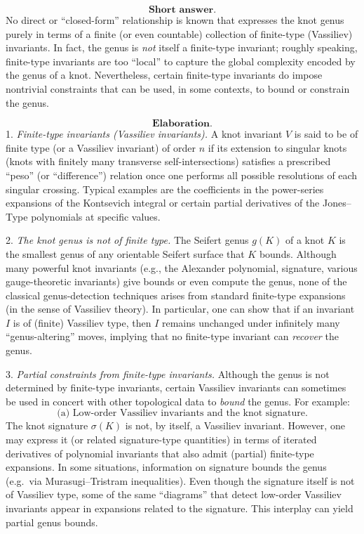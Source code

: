 \documentclass[12p]{article}
\newcounter{answercounter}
\newenvironment{answer}[1][]
{\refstepcounter{answercounter}%
\begin{tcolorbox}[
    title=Answer \theanswercounter: #1,
    colback=white, %
    colframe=gray,
    coltext=black, %
    fonttitle=\bfseries\normalsize,
    top=2mm,
    bottom=2mm,
    enlarge top initially by=5mm
]
\small
}
{\end{tcolorbox}}
\begin{document}
\begin{answer}[by openai/o1 (generated in 0 minutes and 50 seconds.)]
\[
\textbf{Short answer.}
\]
No direct or “closed-form” relationship is known that expresses the knot genus purely in terms of a finite (or even countable) collection of finite-type (Vassiliev) invariants.  In fact, the genus is \emph{not} itself a finite-type invariant; roughly speaking, finite-type invariants are too “local” to capture the global complexity encoded by the genus of a knot.  Nevertheless, certain finite-type invariants do impose nontrivial constraints that can be used, in some contexts, to bound or constrain the genus.

\[
\textbf{Elaboration.}
\]
1.  \emph{Finite-type invariants (Vassiliev invariants).}  
   A knot invariant \(V\) is said to be of finite type (or a Vassiliev invariant) of order \(n\) if its extension to singular knots (knots with finitely many transverse self-intersections) satisfies a prescribed “peso” (or “difference”) relation once one performs all possible resolutions of each singular crossing.  Typical examples are the coefficients in the power-series expansions of the Kontsevich integral or certain partial derivatives of the Jones–Type polynomials at specific values.

2.  \emph{The knot genus is not of finite type.}  
   The Seifert genus \(g(K)\) of a knot \(K\) is the smallest genus of any orientable Seifert surface that \(K\) bounds.  Although many powerful knot invariants (e.g., the Alexander polynomial, signature, various gauge-theoretic invariants) give bounds or even compute the genus, none of the classical genus-detection techniques arises from standard finite-type expansions (in the sense of Vassiliev theory).  In particular, one can show that if an invariant \(I\) is of (finite) Vassiliev type, then \(I\) remains unchanged under infinitely many “genus-altering” moves, implying that no finite-type invariant can \emph{recover} the genus.

3.  \emph{Partial constraints from finite-type invariants.}
   Although the genus is not determined by finite-type invariants, certain Vassiliev invariants can sometimes be used in concert with other topological data to \emph{bound} the genus.  For example:
   \[
   \text{(a) Low-order Vassiliev invariants and the knot signature.}
   \]
   The knot signature \(\sigma(K)\) is not, by itself, a Vassiliev invariant.  However, one may express it (or related signature-type quantities) in terms of iterated derivatives of polynomial invariants that also admit (partial) finite-type expansions.  In some situations, information on signature bounds the genus (e.g.\ via Murasugi–Tristram inequalities).  Even though the signature itself is not of Vassiliev type, some of the same “diagrams” that detect low-order Vassiliev invariants appear in expansions related to the signature.  This interplay can yield partial genus bounds.


\end{answer}
\end{document}
